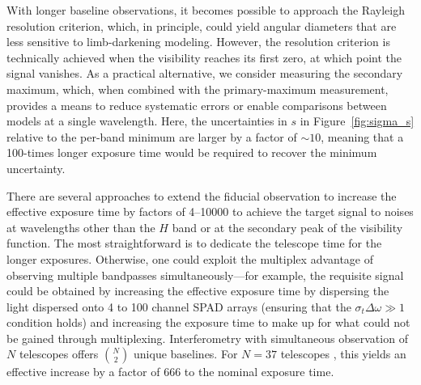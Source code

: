 \documentclass[linenumbers,trackchanges,margins]{aastex701}
\begin{document}
With longer baseline observations, it becomes possible to approach the Rayleigh resolution criterion, which, in principle, could yield angular diameters that are less sensitive to limb-darkening modeling. However, the resolution criterion is technically achieved when the visibility reaches its first zero, at which point the signal vanishes. As a practical alternative, we consider measuring the secondary maximum, which, when combined with the primary-maximum measurement, provides a means to reduce systematic errors or enable comparisons between models at a single wavelength. 
Here, the uncertainties in $s$
in Figure~\ref{fig:sigma_s} relative to the per-band minimum are larger by a factor of $\sim 10$, meaning that
a 100-times longer exposure time would be required to recover the minimum uncertainty.

There are several approaches to extend the fiducial observation to increase the
effective exposure time by factors of 4--10000 to achieve the target signal to noises at wavelengths
other than the $H$ band or at the secondary peak of the visibility function.
The most straightforward is to dedicate the telescope time for the longer exposures.  Otherwise,
one could exploit the multiplex advantage of observing multiple bandpasses simultaneously---for example, the requisite signal could be obtained by increasing the effective exposure time by dispersing the light dispersed onto 4 to 100 channel SPAD arrays (ensuring that the $\sigma_t \Delta \omega \gg 1$ condition holds)
and increasing the exposure time to make up for
what could not be gained through multiplexing.
Interferometry with simultaneous observation of $N$ telescopes offers ${N \choose 2}$ unique baselines. For $N=37$ telescopes \citep[the number of Small-Sized Telescopes planned for the Cherenkov Telescope Array Observatory-South][]{2022SPIE12182E..0KT}, this yields an effective increase by a factor of 666 to the nominal exposure time. 
\end{document}
